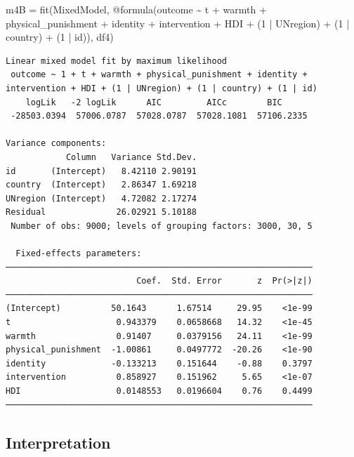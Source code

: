\documentclass[
  letterpaper,
  DIV=11,
  numbers=noendperiod]{scrreprt}
\newenvironment{Shaded}{\begin{snugshade}}{\end{snugshade}}
\newcommand{\FloatTok}[1]{\textcolor[rgb]{0.68,0.00,0.00}{#1}}
\newcommand{\FunctionTok}[1]{\textcolor[rgb]{0.28,0.35,0.67}{#1}}
\newcommand{\NormalTok}[1]{\textcolor[rgb]{0.00,0.23,0.31}{#1}}
\newcommand{\OperatorTok}[1]{\textcolor[rgb]{0.37,0.37,0.37}{#1}}
\newcommand{\PreprocessorTok}[1]{\textcolor[rgb]{0.68,0.00,0.00}{#1}}
\begin{document}
\begin{Shaded}
\begin{Highlighting}[]
\NormalTok{m4B }\OperatorTok{=} \FunctionTok{fit}\NormalTok{(MixedModel, }\PreprocessorTok{@formula}\NormalTok{(outcome }\OperatorTok{\textasciitilde{}}\NormalTok{ t }\OperatorTok{+}\NormalTok{ warmth }\OperatorTok{+} 
\NormalTok{                                  physical\_punishment }\OperatorTok{+} 
\NormalTok{                                  identity }\OperatorTok{+}\NormalTok{ intervention }\OperatorTok{+} 
\NormalTok{                                  HDI }\OperatorTok{+}
\NormalTok{                                  (}\FloatTok{1} \OperatorTok{|}\NormalTok{ UNregion) }\OperatorTok{+} 
\NormalTok{                                  (}\FloatTok{1} \OperatorTok{|}\NormalTok{ country) }\OperatorTok{+} 
\NormalTok{                                  (}\FloatTok{1} \OperatorTok{|}\NormalTok{ id)), df4)}
\end{Highlighting}
\end{Shaded}

\begin{verbatim}
Linear mixed model fit by maximum likelihood
 outcome ~ 1 + t + warmth + physical_punishment + identity + intervention + HDI + (1 | UNregion) + (1 | country) + (1 | id)
    logLik   -2 logLik      AIC         AICc        BIC     
 -28503.0394  57006.0787  57028.0787  57028.1081  57106.2335

Variance components:
            Column   Variance Std.Dev.
id       (Intercept)   8.42110 2.90191
country  (Intercept)   2.86347 1.69218
UNregion (Intercept)   4.72082 2.17274
Residual              26.02921 5.10188
 Number of obs: 9000; levels of grouping factors: 3000, 30, 5

  Fixed-effects parameters:
─────────────────────────────────────────────────────────────
                          Coef.  Std. Error       z  Pr(>|z|)
─────────────────────────────────────────────────────────────
(Intercept)          50.1643      1.67514     29.95    <1e-99
t                     0.943379    0.0658668   14.32    <1e-45
warmth                0.91407     0.0379156   24.11    <1e-99
physical_punishment  -1.00861     0.0497772  -20.26    <1e-90
identity             -0.133213    0.151644    -0.88    0.3797
intervention          0.858927    0.151962     5.65    <1e-07
HDI                   0.0148553   0.0196604    0.76    0.4499
─────────────────────────────────────────────────────────────
\end{verbatim}

\subsection{Interpretation}\label{interpretation-5}
\end{document}

